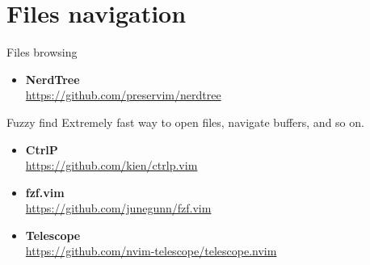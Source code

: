 \documentclass[aspectratio=169]{beamer}
\begin{document}
\section*{Files navigation}
\begin{frame}{\secname}

  \begin{block}{Files browsing}
    \begin{itemize}
      \item {\bf NerdTree}\\ \url{https://github.com/preservim/nerdtree}
    \end{itemize}
  \end{block}

  \begin{block}{Fuzzy find }
    Extremely fast way to open files, navigate buffers, and so on.
    \begin{itemize}
      \item {\bf CtrlP}\\ \url{https://github.com/kien/ctrlp.vim} 
      \item {\bf fzf.vim}\\ \url{https://github.com/junegunn/fzf.vim} 
      \item {\bf Telescope}\\ \url{https://github.com/nvim-telescope/telescope.nvim} 
    \end{itemize}
  \end{block}
    
\end{frame}

\end{document}
